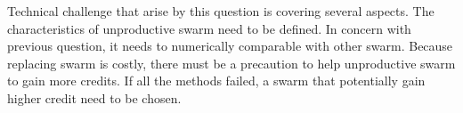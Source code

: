 	
Technical challenge that arise by this question is covering several aspects. The characteristics of unproductive swarm need to be defined. In concern with previous question, it needs to numerically comparable with other swarm. Because replacing swarm is costly, there must be a precaution to help unproductive swarm to gain more credits. If all the methods failed, a swarm that potentially gain higher credit need to be chosen. 
